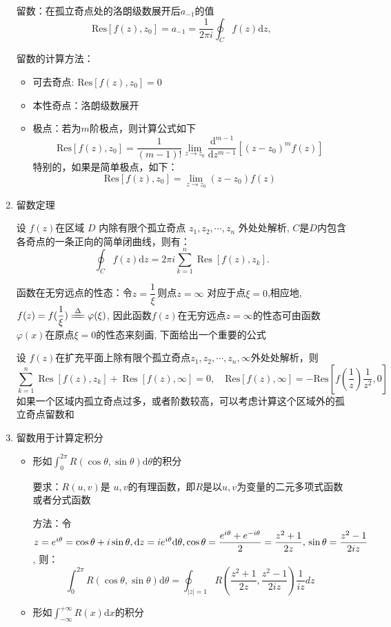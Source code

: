 \documentclass[a4paper,11pt,UTF8]{article}
\begin{document}
\begin{enumerate}
	留数：在孤立奇点处的洛朗级数展开后$a_{-1}$的值
	$$\mathrm{Res}[f(z),z_0]=a_{-1}=\frac1{2\pi i}\oint_Cf(z)\mathrm{d}z,$$
	
	留数的计算方法：
	\begin{itemize}
		\item 可去奇点: $\mathrm{Res}[f(z),z_0]=0$
		\item 本性奇点：洛朗级数展开
		\item 极点：若为$m$阶极点，则计算公式如下
		$$\mathrm{Res}[f(z),z_0]=\frac{1}{(m-1)!}\lim_{z\to z_0}\frac{\mathrm{d}^{m-1}}{\mathrm{d}z^{m-1}}[(z-z_0)^mf(z)] $$
		特别的，如果是简单极点，如下：
		$$\mathrm{Res}[f(z),z_{0}]=\operatorname*{lim}_{z\to z_{0}}(z-z_{0})f(z)$$
	\end{itemize}
	\item 留数定理
	
	设 $f(z)$在区域 $D$ 内除有限个孤立奇点 $z_1,z_2,\cdots,z_n$ 外处处解析, $C$是$D $内包含各奇点的一条正向的简单闭曲线，则有：
	$$
	\oint_Cf(z)\mathrm{d}z=2\pi i\sum_{k=1}^n\operatorname{Res}[f(z),z_k].
	$$
	
	函数在无穷远点的性态：令$z=\dfrac1\xi$\,则点$z=\infty$ 对应于点$\xi=0$,相应地,$f(z)=f(\dfrac1\xi)\xlongequal{\Delta} \varphi ( \xi )$, 因此函数$f(z)$在无穷远点$z=\infty$的性态可由函数$\varphi(x)$在原点$\xi=0$的性态来刻画, 下面给出一个重要的公式
	
	设 $f(z)$在扩充平面上除有限个孤立奇点$z_1,z_2,\cdots,z_n,\infty$外处处解析，则$$\sum_{k=1}^n\operatorname{Res}[f(z),z_k]+\operatorname{Res}[f(z),\infty]=0,\quad\mathrm{Res}[f(z),\infty]=-\mathrm{Res}[f(\frac1{z})\frac1{z^2},0]$$
	如果一个区域内孤立奇点过多，或者阶数较高，可以考虑计算这个区域外的孤立奇点留数和
	\item 留数用于计算定积分
	\begin{itemize}
		\item 形如$\displaystyle\int_0^{2\pi}R(\cos\theta,\sin\theta)\mathrm{d}\theta$的积分
		
		要求：$R(u,v)$是 $u,v$的有理函数，即$R$是以$u,v$为变量的二元多项式函数或者分式函数
		
		方法：令$z=e^{i\theta}=\cos\theta+i\sin\theta, \mathrm{d}z=ie^{i\theta}\mathrm{d}\theta, \cos\theta=\dfrac{e^{i\theta}+e^{-i\theta}}2=\dfrac{z^2+1}{2z},\newline\sin\theta=\dfrac{z^2-1}{2iz}$, 则：
		$$\int_0^{2\pi}R(\cos\theta,\sin\theta)\mathrm{d}\theta=\oint_{|z|=1}R(\frac{z^2+1}{2z},\frac{z^2-1}{2iz})\frac1{iz}dz$$
		\item 形如$\displaystyle\int_{-\infty}^{+\infty}R(x)\mathrm{d}x$的积分
		

\end{itemize}
\end{enumerate}
\end{document}
